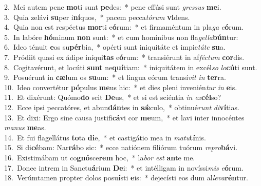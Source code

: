 {2.~}Mei autem pene \textbf{mo}ti sunt \textbf{pe}des:~* pene effúsi sunt \textit{gres}\textit{sus} \textbf{me}i.\\
{3.~}Quia zelávi \textbf{su}per i\textbf{ní}quos,~* pacem pecca\textit{tó}\textit{rum} \textbf{vi}dens.\\
{4.~}Quia non est respéctus \textbf{mor}ti e\textbf{ó}rum:~* et firmaméntum in pla\textit{ga} \textit{e}\textbf{ó}rum.\\
{5.~}In labóre \textbf{hó}minum \textbf{non} sunt:~* et cum homínibus non fla\textit{gel}\textit{la}\textbf{bún}tur:\\
{6.~}Ideo ténuit \textbf{e}os su\textbf{pér}bia,~* opérti sunt iniquitáte et impie\textit{tá}\textit{te} \textbf{su}a.\\
{7.~}Pródiit quasi ex ádipe iníqui\textbf{tas} e\textbf{ó}rum:~* transiérunt in af\textit{fé}\textit{ctum} \textbf{cor}dis.\\
{8.~}Cogitavérunt, et locúti \textbf{sunt} ne\textbf{quí}tiam:~* iniquitátem in excél\textit{so} \textit{lo}\textbf{cú}ti sunt.\\
{9.~}Posuérunt in \textbf{cæ}lum os \textbf{su}um:~* et lingua eórum transí\textit{vit} \textit{in} \textbf{ter}ra.\\
{10.~}Ideo convertétur \textbf{pó}pulus \textbf{me}us hic:~* et dies pleni invenién\textit{tur} \textit{in} \textbf{e}is.\\
{11.~}Et dixérunt: Quómo\textbf{do} scit \textbf{De}us,~* et si est sciéntia \textit{in} \textit{ex}\textbf{cél}so?\\
{12.~}Ecce ipsi peccatóres, et abun\textbf{dán}tes in \textbf{sǽ}culo,~* obtinué\textit{runt} \textit{di}\textbf{ví}tias.\\
{13.~}Et dixi: Ergo sine causa justifi\textbf{cá}vi cor \textbf{me}um,~* et lavi inter innocéntes \textit{ma}\textit{nus} \textbf{me}as.\\
{14.~}Et fui flagellátus \textbf{to}ta \textbf{di}e,~* et castigátio mea in \textit{ma}\textit{tu}\textbf{tí}nis.\\
{15.~}Si di\textbf{cé}bam: Nar\textbf{rá}bo sic:~* ecce natiónem filiórum tuórum \textit{re}\textit{pro}\textbf{bá}vi.\\
{16.~}Existimábam ut co\textbf{gnó}sce\textbf{rem} hoc,~* la\textit{bor} \textit{est} \textbf{an}te me.\\
{17.~}Donec intrem in Sanctu\textbf{á}rium \textbf{De}i:~* et intélligam in novíssi\textit{mis} \textit{e}\textbf{ó}rum.\\
{18.~}Verúmtamen propter dolos posu\textbf{í}sti \textbf{e}is:~* dejecísti eos dum al\textit{le}\textit{va}\textbf{rén}tur.\\
